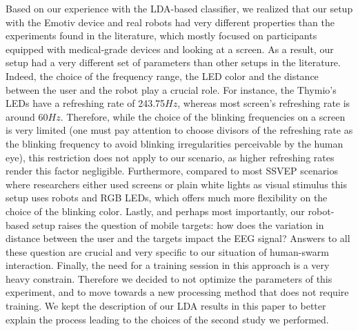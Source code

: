 \documentclass[smallextended]{svjour3}
\begin{document}
Based on our experience with the LDA-based classifier, we realized that our setup with the Emotiv device and real robots had very different properties than the experiments found in the literature, which mostly focused on participants equipped with medical-grade devices and looking at a screen.
As a result, our setup had a very different set of parameters than other setups in the literature. 
Indeed, the choice of the frequency range, the LED color and the distance between the user and the robot play a crucial role. 
For instance, the Thymio's LEDs have a refreshing rate of 243.75$Hz$, whereas most screen's refreshing rate is around 60$Hz$. Therefore, while the choice of the blinking frequencies on a screen is very limited (one must pay attention to choose divisors of the refreshing rate as the blinking frequency to avoid blinking irregularities perceivable by the human eye), this restriction does not apply to our scenario, as higher refreshing rates render this factor negligible. Furthermore, compared to most SSVEP scenarios where researchers either used screens or plain white lights as visual stimulus this setup uses robots and RGB LEDs, which offers much more flexibility on the choice of the blinking color. Lastly, and perhaps most importantly, our robot-based setup raises the question of mobile targets: how does the variation in distance between the user and the targets impact the EEG signal? Answers to all these question are crucial and very specific to our situation of human-swarm interaction.
Finally, the need for a training session in this approach is a very heavy constrain. Therefore we decided to not optimize the parameters of this experiment, and to move towards a new processing method that does not require training. We kept the description of our LDA results in this paper to better explain the process leading to the choices of the second study we performed.
\end{document}
